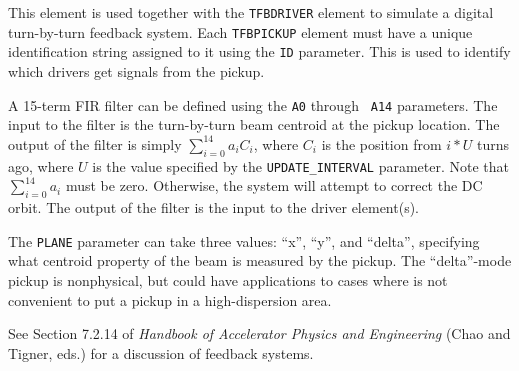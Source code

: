 This element is used together with the {\tt TFBDRIVER} element to
simulate a digital turn-by-turn feedback system.  Each {\tt TFBPICKUP}
element must have a unique identification string assigned to it using
the {\tt ID} parameter.  This is used to identify which drivers get
signals from the pickup.

A 15-term FIR filter can be defined using the {\tt A0} through {\tt
A14} parameters.  The input to the filter is the turn-by-turn beam
centroid at the pickup location.  The output of the filter is simply
$\sum_{i=0}^{14} a_i C_i$, where $C_i$ is the position from $i*U$ turns
ago, where $U$ is the value specified by the \verb|UPDATE_INTERVAL| parameter.
Note that $\sum_{i=0}^{14} a_i$ must be zero. Otherwise, the
system will attempt to correct the DC orbit.  The output of the filter
is the input to the driver element(s).

The \verb|PLANE| parameter can take three values: ``x'', ``y'', and ``delta'', specifying
what centroid property of the beam is measured by the pickup. The ``delta''-mode pickup
is nonphysical, but could have applications to cases where is not convenient to put a 
pickup in a high-dispersion area.

See Section 7.2.14 of {\em Handbook of Accelerator Physics and Engineering}
(Chao and Tigner, eds.) for a discussion of feedback systems.
